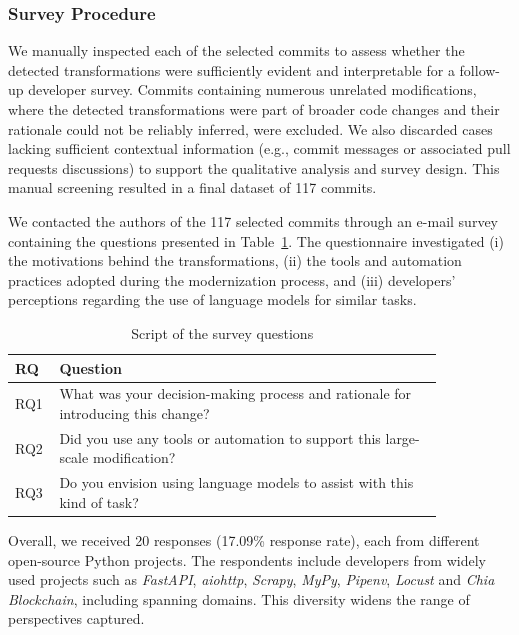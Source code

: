 \subsubsection{Survey Procedure}

We manually inspected each of the selected commits to assess whether the detected transformations were sufficiently evident and interpretable for a follow-up developer survey. Commits containing numerous unrelated modifications, where the detected transformations were part of broader code changes and their rationale could not be reliably inferred, were excluded. We also discarded cases lacking sufficient contextual information (e.g., commit messages or associated pull requests discussions) to support the qualitative analysis and survey design. This manual screening resulted in a final dataset of 117 commits.

We contacted the authors of the 117 selected commits through an e-mail survey containing the questions presented in Table~\ref{tab:survey_questions}. The questionnaire investigated (i) the motivations behind the transformations, (ii) the tools and automation practices adopted during the modernization process, and (iii) developers' perceptions regarding the use of language models for similar tasks.

\begin{table}[htb]
\caption{Script of the survey questions}
\label{tab:survey_questions}
\centering
\begin{tabular}{p{0.05\linewidth} p{0.80\linewidth}}
\toprule
\textbf{RQ} & \textbf{Question} \\
\midrule
RQ1 &
What was your decision-making process and rationale for introducing this change? \\

RQ2 &
Did you use any tools or automation to support this large-scale modification? \\

RQ3 &
Do you envision using language models to assist with this kind of task? \\
\bottomrule
\end{tabular}
\end{table}

Overall, we received 20 responses (17.09\% response rate), each from different open-source Python projects. The respondents include developers from widely used projects such as \textit{FastAPI}, \textit{aiohttp}, \textit{Scrapy}, \textit{MyPy}, \textit{Pipenv}, \textit{Locust} and \textit{Chia Blockchain}, including spanning domains. This diversity widens the range of perspectives captured.

